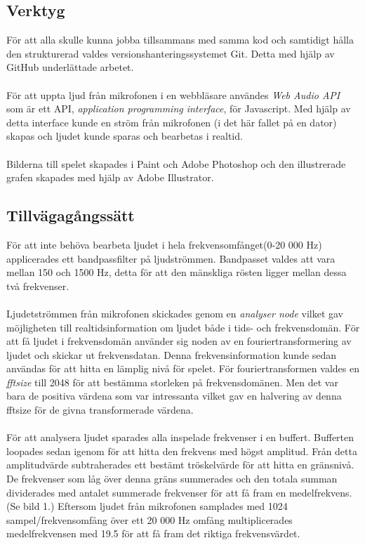 \documentclass[12pt, titlepage, a4paper]{article}
\begin{document}
		\subsection{Verktyg}
			För att alla skulle kunna jobba tillsammans med samma kod och samtidigt hålla den strukturerad valdes versionshanteringssystemet Git. Detta med hjälp av GitHub underlättade arbetet.
			\\ \\
			För att uppta ljud från mikrofonen i en webbläsare användes \textit{Web Audio API}\cite{MDN} som är ett API, \textit{application programming interface}, för Javascript. Med hjälp av detta interface kunde en ström från mikrofonen (i det här fallet på en dator) skapas och ljudet kunde sparas och bearbetas i realtid.
			\\ \\
			Bilderna till spelet skapades i Paint och Adobe Photoshop och den illustrerade grafen skapades med hjälp av Adobe Illustrator.

		\subsection{Tillvägagångssätt}
			För att inte behöva bearbeta ljudet i hela frekvensomfånget(0-20 000 Hz) applicerades ett bandpassfilter på ljudströmmen. Bandpasset valdes att vara mellan 150 och 1500 Hz, detta för att den mänskliga rösten ligger mellan dessa två frekvenser\cite{freq}.
			\\ \\
			Ljudetströmmen från mikrofonen skickades genom en \textit{analyser node} vilket gav möjligheten till realtidsinformation om ljudet både i tids- och frekvensdomän. För att få ljudet i frekvensdomän använder sig noden av en fouriertransformering av ljudet och skickar ut frekvensdatan. Denna frekvensinformation kunde sedan användas för att hitta en lämplig nivå för spelet. För fouriertransformen valdes en \textit{fftsize} till 2048 för att bestämma storleken på frekvensdomänen. Men det var bara de positiva värdena som var intressanta vilket gav en halvering av denna fftsize för de givna transformerade värdena\cite{AnalyserNode}.
			\\ \\
			För att analysera ljudet sparades alla inspelade frekvenser i en buffert. Bufferten loopades sedan igenom för att hitta den frekvens med högst amplitud. Från detta amplitudvärde subtraherades ett bestämt tröskelvärde för att hitta en gränsnivå. De frekvenser som låg över denna gräns summerades och den totala summan dividerades med antalet summerade frekvenser för att få fram en medelfrekvens. (Se bild 1.) Eftersom ljudet från mikrofonen samplades med 1024 sampel/frekvensomfång över ett 20 000 Hz omfång multiplicerades medelfrekvensen med 19.5 för att få fram det riktiga frekvensvärdet.
\end{document}
